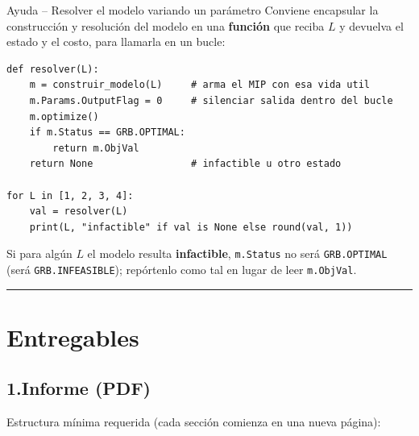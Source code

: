 \documentclass[12pt,a4paper]{article}
\begin{document}
\begin{ayuda}{Ayuda -- Resolver el modelo variando un parámetro}
\vspace{2pt}
Conviene encapsular la construcción y resolución del modelo en una \textbf{función}
que reciba $L$ y devuelva el estado y el costo, para llamarla en un bucle:
\begin{lstlisting}
def resolver(L):
    m = construir_modelo(L)     # arma el MIP con esa vida util
    m.Params.OutputFlag = 0     # silenciar salida dentro del bucle
    m.optimize()
    if m.Status == GRB.OPTIMAL:
        return m.ObjVal
    return None                 # infactible u otro estado

for L in [1, 2, 3, 4]:
    val = resolver(L)
    print(L, "infactible" if val is None else round(val, 1))
\end{lstlisting}
Si para algún $L$ el modelo resulta \textbf{infactible}, \texttt{m.Status} no será
\texttt{GRB.OPTIMAL} (será \texttt{GRB.INFEASIBLE}); repórtenlo como tal en lugar
de leer \texttt{m.ObjVal}.
\end{ayuda}

\noindent\rule{\linewidth}{0.4pt}

\section*{Entregables}

\subsection*{1.\quad Informe (PDF)}

Estructura mínima requerida (cada sección comienza en una nueva página):
\end{document}
